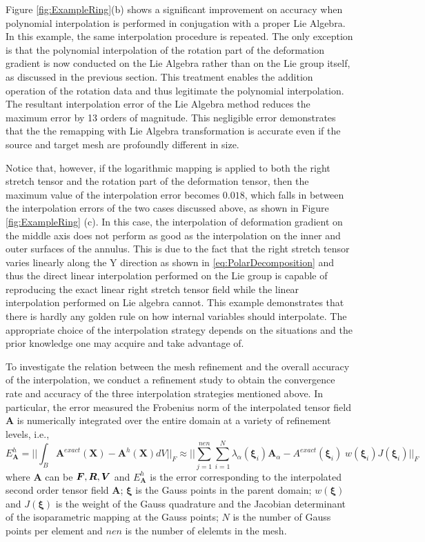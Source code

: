 \documentclass[12pt]{article}
\newcommand{\mbs}[1]{\boldsymbol{#1}}
\def\bA{{\mbs{A}}} \def\bB{{\mbs{B}}} \def\bC{{\mbs{C}}}
\def\bU{{\mbs{V}}} \def\bW{{\mbs{W}}} \def\bX{{\mbs{X}}}
\def\bxi{{\mbs{\xi}}}
\begin{document}
Figure \ref{fig:ExampleRing}(b) shows a significant improvement on accuracy when polynomial interpolation is performed in conjugation with a proper Lie Algebra.  In this example, the same interpolation procedure is repeated. The only exception is that the polynomial interpolation of the rotation part of the deformation gradient  is now conducted on the Lie Algebra rather than on the Lie group itself, as discussed in the previous section.  This treatment enables the addition operation of the rotation data and thus legitimate the polynomial interpolation. The resultant interpolation error of the Lie Algebra method reduces the maximum error by 13 orders of magnitude. This negligible error demonstrates that the the remapping with Lie Algebra transformation is accurate even if the source and target mesh are profoundly different in size. 

Notice that, however, if the logarithmic mapping is applied to both the right stretch tensor and the rotation part of the deformation tensor, then the maximum value of the interpolation error becomes $0.018$, which falls in between the interpolation errors of the two cases discussed above, as shown in Figure \ref{fig:ExampleRing} (c). In this case, the interpolation of deformation gradient on the middle axis does not perform as good as the interpolation on the inner and outer surfaces of the annulus. This is due to the fact that the right stretch tensor varies linearly along the Y direction as shown in \ref{eq:PolarDecomposition} and thus the direct linear interpolation performed on the Lie group is capable of reproducing the exact linear right stretch tensor field while the linear interpolation performed on Lie algebra cannot. This example demonstrates that there is hardly any golden rule on how internal variables should interpolate. The appropriate choice of the interpolation strategy depends on the situations and the prior knowledge one may acquire and take advantage of.  

To investigate the relation between the mesh refinement and the overall accuracy of the interpolation, we conduct a refinement study to obtain the convergence rate and accuracy of the three interpolation strategies mentioned above. In particular,  the error measured the Frobenius norm of the interpolated tensor field $\bA$ is numerically integrated over the entire domain at a variety of refinement levels, i.e., 
\begin{equation}
E_{\bA}^{h} =  || \int_{B} \bA^{exact} (\bX)- \bA^{h}(\bX) dV ||_{F}   
 \approx || \sum^{nen}_{j=1}\sum^{N}_{i=1}    \lambda_{\alpha} (\bxi_{i}) \bA_{\alpha} - A^{exact}(\bxi_{i})  \; w(\bxi_{i})  J(\bxi_{i}) ||_{F} 
\label{eq:FrobeniusNormOverall}
\end{equation}
where $\bA$ can be $\bF, \bR, \bU$ and $E_{\bA}^{h}$ is the error corresponding to the interpolated second order tensor field $\bA$; $\bxi$ is the Gauss points in the parent domain;  $w(\bxi)$ and $J(\bxi)$ is the weight of the Gauss quadrature and the Jacobian determinant of the isoparametric mapping at the Gauss points; $N$ is the number of Gauss points per element  and $nen$ is the number of elelemts in the mesh. 
\end{document}
